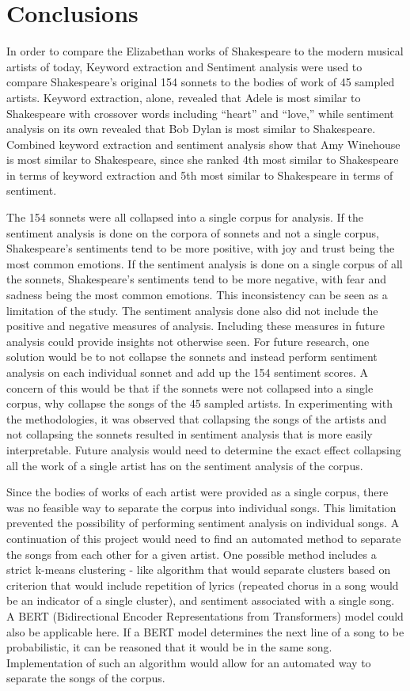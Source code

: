 \documentclass[11pt]{article}
\begin{document}
\section{Conclusions}
In order to compare the Elizabethan works of Shakespeare to the modern musical artists of today, Keyword extraction and Sentiment analysis were used to compare Shakespeare’s original 154 sonnets to the bodies of work of 45 sampled artists. Keyword extraction, alone, revealed that Adele is most similar to Shakespeare with crossover words including “heart” and “love,” while sentiment analysis on its own revealed that Bob Dylan is most similar to Shakespeare. Combined keyword extraction and sentiment analysis show that Amy Winehouse is most similar to Shakespeare, since she ranked 4th most similar to Shakespeare in terms of keyword extraction and 5th most similar to Shakespeare in terms of sentiment. 

\noindent The 154 sonnets were all collapsed into a single corpus for analysis. If the sentiment analysis is done on the corpora of sonnets and not a single corpus, Shakespeare’s sentiments tend to be more positive, with joy and trust being the most common emotions. If the sentiment analysis is done on a single corpus of all the sonnets, Shakespeare’s sentiments tend to be more negative, with fear and sadness being the most common emotions. This inconsistency can be seen as a limitation of the study. The sentiment analysis done also did not include the positive and negative measures of analysis. Including these measures in future analysis could provide insights not otherwise seen. For future research, one solution would be to not collapse the sonnets and instead perform sentiment analysis on each individual sonnet and add up the 154 sentiment scores. A concern of this would be that if the sonnets were not collapsed into a single corpus, why collapse the songs of the 45 sampled artists. In experimenting with the methodologies, it was observed that collapsing the songs of the artists and not collapsing the sonnets resulted in sentiment analysis that is more easily interpretable. Future analysis would need to determine the exact effect collapsing all the work of a single artist has on the sentiment analysis of the corpus. 

\noindent Since the bodies of works of each artist were provided as a single corpus, there was no feasible way to separate the corpus into individual songs. This limitation prevented the possibility of performing sentiment analysis on individual songs. A continuation of this project would need to find an automated method to separate the songs from each other for a given artist. One possible method includes a strict k-means clustering - like algorithm that would separate clusters based on criterion that would include repetition of lyrics (repeated chorus in a song would be an indicator of a single cluster), and sentiment associated with a single song. A BERT (Bidirectional Encoder Representations from Transformers) model could also be applicable here. If a BERT model determines the next line of a song to be probabilistic, it can be reasoned that it would be in the same song. Implementation of such an algorithm would allow for an automated way to separate the songs of the corpus.
\end{document}
